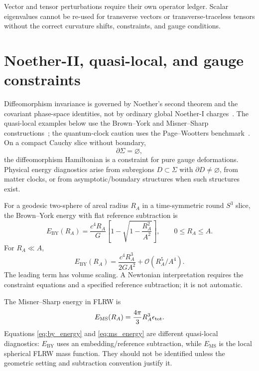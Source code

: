 \documentclass[
  aps,
  prd,
  reprint,
  superscriptaddress,
  nofootinbib,
  floatfix,
  longbibliography
]{revtex4-2}
\newcommand{\BY}{\mathrm{BY}}
\newcommand{\MS}{\mathrm{MS}}
\newcommand{\bigO}{\mathcal O}
\begin{document}
Vector and tensor perturbations require their own operator ledger.
Scalar eigenvalues cannot be re-used for transverse vectors or
transverse-traceless tensors without the correct curvature shifts,
constraints, and gauge conditions.

\section{Noether-II, quasi-local, and gauge constraints}
\label{sec:noether}

Diffeomorphism invariance is governed by Noether's second theorem and the covariant phase-space identities, not
by ordinary global Noether-I charges~\cite{IyerWald1994,Wald1984}.
The quasi-local examples below use the Brown--York and Misner--Sharp constructions~\cite{BrownYork1993,MisnerSharp1964}; the quantum-clock caution uses the Page--Wootters benchmark~\cite{PageWootters1983}.  On a compact Cauchy slice without
boundary,
\begin{equation}
  \partial\Sigma=\varnothing ,
\end{equation}
the diffeomorphism Hamiltonian is a constraint for pure gauge
deformations.  Physical energy diagnostics arise from subregions
\(D\subset\Sigma\) with \(\partial D\ne\varnothing\), from matter
clocks, or from asymptotic/boundary structures when such structures
exist.

For a geodesic two-sphere of areal radius \(R_A\) in a time-symmetric
round \(S^3\) slice, the Brown--York energy with flat reference
subtraction is~\cite{BrownYork1993,York1972}
\begin{equation}
  E_{\BY}(R_A)
  =
  \frac{c^4R_A}{G}
  \left[
  1-\sqrt{1-\frac{R_A^2}{A^2}}
  \right],
  \qquad 0\le R_A\le A .
  \label{eq:by_energy}
\end{equation}
For \(R_A\ll A\),
\begin{equation}
  E_{\BY}(R_A)
  =
  \frac{c^4R_A^3}{2GA^2}
  +\bigO(R_A^5/A^4).
  \label{eq:by_small}
\end{equation}
The leading term has volume scaling.  A Newtonian interpretation
requires the constraint equations and a specified reference subtraction;
it is not automatic.

The Misner--Sharp energy in FLRW is
\begin{equation}
  E_{\MS}(R_A)=\frac{4\pi}{3}R_A^3\epsilon_{\rm tot}.
  \label{eq:ms_energy}
\end{equation}
Equations \eqref{eq:by_energy} and \eqref{eq:ms_energy} are different
quasi-local diagnostics: \(E_{\BY}\) uses an embedding/reference
subtraction, while \(E_{\MS}\) is the local spherical FLRW mass
function.  They should not be identified unless the geometric setting
and subtraction convention justify it.
\end{document}
